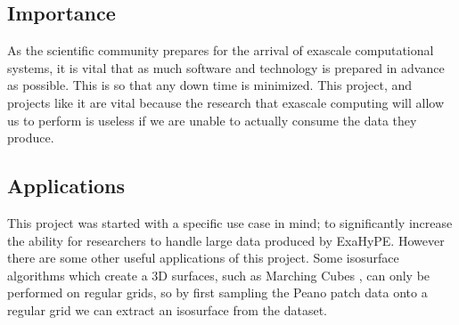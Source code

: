 \documentclass[12pt,a4paper]{article}
\begin{document}
\subsection{Importance}
As the scientific community prepares for the arrival of exascale computational systems, it is vital that as much software and technology is prepared in advance as possible. This is so that any down time is minimized. This project, and projects like it are vital because the research that exascale computing will allow us to perform is useless if we are unable to actually consume the data they produce.

\subsection{Applications}
This project was started with a specific use case in mind; to significantly increase the ability for researchers to handle large data produced by ExaHyPE. However there are some other useful applications of this project. Some isosurface algorithms which create a 3D surfaces, such as Marching Cubes \cite{Lorensen:1987:MCH:37402.37422}, can only be performed on regular grids, so by first sampling the Peano patch data onto a regular grid we can extract an isosurface from the dataset.


\end{document}
